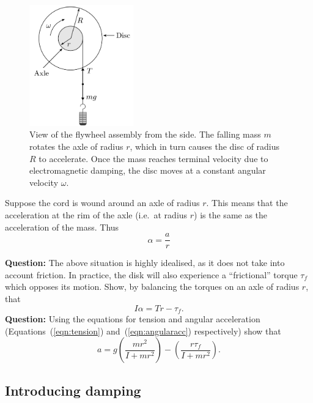 \begin{figure}[!htb]
    \centering
    \includegraphics[width=0.4\textwidth]{figs/em-damping/emdamping-torque.png}
    \caption{View of the flywheel assembly from the side. The falling mass $m$ rotates the axle of radius $r$, which in turn causes the disc of radius $R$ to accelerate. Once the mass reaches terminal velocity due to electromagnetic damping, the disc moves at a constant angular velocity $\omega$. }
    \label{fig:emdamping-torque}
\end{figure}

Suppose the cord is wound around an axle of radius $r$. This means that the acceleration at the rim of the axle (i.e.\ at radius $r$) is the same as the acceleration of the mass. Thus
\begin{equation}
    \alpha = \frac{a}{r}
    \label{eqn:angularacc}
\end{equation}

\begin{question}
\textbf{Question:} The above situation is highly idealised, as it does not take into account friction. In practice, the disk will also experience a ``frictional'' torque $\tau_f$ which opposes its motion. Show, by balancing the torques on an axle of radius $r$, that 
\begin{equation}
    I \alpha = T r - \tau_f.
\end{equation}
\textbf{Question:} Using the equations for tension and angular acceleration (Equations~(\ref{eqn:tension}) and~(\ref{eqn:angularacc}) respectively) show that 
\begin{equation}
    a = g \left( \frac{m r^2}{I + mr^2}\right) - \left( \frac{r \tau_f}{I + mr^2}\right).
    \label{eqn:acc}
\end{equation}
\end{question}

\subsection*{Introducing damping}

